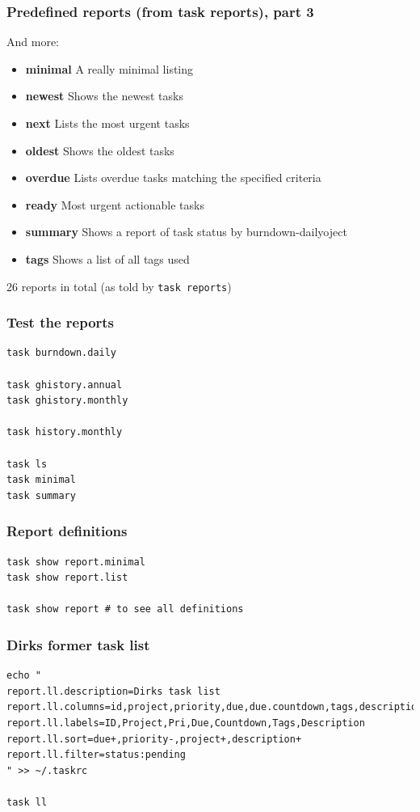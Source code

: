 \documentclass[t]{beamer}
\begin{document}
\begin{frame}[fragile]\frametitle{Predefined reports (from task reports), part 3}
    And more:

    \begin{itemize}
        \item \textbf{minimal}          A really minimal listing
        \item \textbf{newest}           Shows the newest tasks
        \item \textbf{next}             Lists the most urgent tasks
        \item \textbf{oldest}           Shows the oldest tasks
        \item \textbf{overdue}          Lists overdue tasks matching the specified criteria
        \item \textbf{ready}            Most urgent actionable tasks
        \item \textbf{summary}          Shows a report of task status by burndown-dailyoject
        \item \textbf{tags}             Shows a list of all tags used
    \end{itemize}

    26 reports in total (as told by \verb=task reports=)
\end{frame}

\begin{frame}[fragile]\frametitle{Test the reports}
    \vfill
    \begin{lstlisting}
task burndown.daily

task ghistory.annual
task ghistory.monthly

task history.monthly

task ls
task minimal
task summary\end{lstlisting}
\end{frame}

\begin{frame}[fragile]\frametitle{Report definitions}
    \vfill
    \begin{lstlisting}
task show report.minimal
task show report.list

task show report # to see all definitions\end{lstlisting}
\end{frame}

\begin{frame}[fragile]\frametitle{Dirks former task list}
    \vfill
    \begin{lstlisting}
echo "
report.ll.description=Dirks task list
report.ll.columns=id,project,priority,due,due.countdown,tags,description
report.ll.labels=ID,Project,Pri,Due,Countdown,Tags,Description
report.ll.sort=due+,priority-,project+,description+
report.ll.filter=status:pending
" >> ~/.taskrc

task ll\end{lstlisting}
\end{frame}
\end{document}
